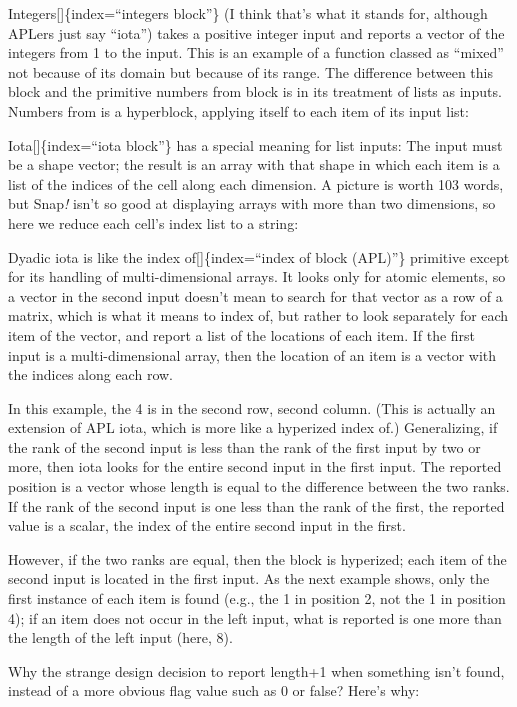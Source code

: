 \documentclass[
  letterpaper,
]{book}
\begin{document}
Integers{[}{]}\{index=``integers block''\} (I think that's what it
stands for, although APLers just say ``iota'') takes a positive integer
input and reports a vector of the integers from 1 to the input. This is
an example of a function classed as ``mixed'' not because of its domain
but because of its range. The difference between this block and the
primitive numbers from block is in its treatment of lists as inputs.
Numbers from is a hyperblock, applying itself to each item of its input
list:

Iota{[}{]}\{index=``iota block''\} has a special meaning for list
inputs: The input must be a shape vector; the result is an array with
that shape in which each item is a list of the indices of the cell along
each dimension. A picture is worth 103 words, but Snap\emph{!} isn't so
good at displaying arrays with more than two dimensions, so here we
reduce each cell's index list to a string:

Dyadic iota is like the index of{[}{]}\{index=``index of block (APL)''\}
primitive except for its handling of multi-dimensional arrays. It looks
only for atomic elements, so a vector in the second input doesn't mean
to search for that vector as a row of a matrix, which is what it means
to index of, but rather to look separately for each item of the vector,
and report a list of the locations of each item. If the first input is a
multi-dimensional array, then the location of an item is a vector with
the indices along each row.

In this example, the 4 is in the second row, second column. (This is
actually an extension of APL iota, which is more like a hyperized index
of.) Generalizing, if the rank of the second input is less than the rank
of the first input by two or more, then iota looks for the entire second
input in the first input. The reported position is a vector whose length
is equal to the difference between the two ranks. If the rank of the
second input is one less than the rank of the first, the reported value
is a scalar, the index of the entire second input in the first.

However, if the two ranks are equal, then the block is hyperized; each
item of the second input is located in the first input. As the next
example shows, only the first instance of each item is found (e.g., the
1 in position 2, not the 1 in position 4); if an item does not occur in
the left input, what is reported is one more than the length of the left
input (here, 8).

Why the strange design decision to report length+1 when something isn't
found, instead of a more obvious flag value such as 0 or false? Here's
why:
\end{document}
